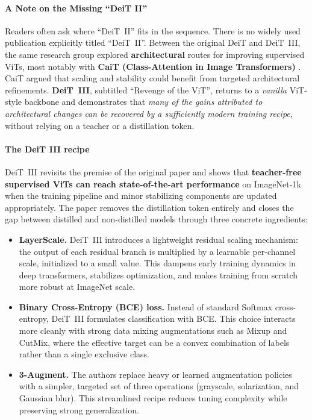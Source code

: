 \paragraph{A Note on the Missing ``DeiT II''}
\noindent
Readers often ask where ``DeiT~II'' fits in the sequence. There is no widely used publication explicitly titled ``DeiT~II''. Between the original DeiT and DeiT~III, the same research group explored \textbf{architectural} routes for improving supervised ViTs, most notably with \textbf{CaiT (Class-Attention in Image Transformers)} \cite{touvron2021_cait}. CaiT argued that scaling and stability could benefit from targeted architectural refinements. \textbf{DeiT~III}, subtitled ``Revenge of the ViT'', returns to a \emph{vanilla} ViT-style backbone and demonstrates that \emph{many of the gains attributed to architectural changes can be recovered by a sufficiently modern training recipe}, without relying on a teacher or a distillation token.

\paragraph{The DeiT III recipe}
\noindent
DeiT~III revisits the premise of the original paper and shows that \textbf{teacher-free supervised ViTs can reach state-of-the-art performance} on ImageNet-1k when the training pipeline and minor stabilizing components are updated appropriately. The paper removes the distillation token entirely and closes the gap between distilled and non-distilled models through three concrete ingredients:

\begin{itemize}
	\item \textbf{LayerScale.}
	DeiT~III introduces a lightweight residual scaling mechanism:
	the output of each residual branch is multiplied by a learnable per-channel scale,
	initialized to a small value.
	This dampens early training dynamics in deep transformers,
	stabilizes optimization,
	and makes training from scratch more robust at ImageNet scale.
	
	\item \textbf{Binary Cross-Entropy (BCE) loss.}
	Instead of standard Softmax cross-entropy,
	DeiT~III formulates classification with BCE.
	This choice interacts more cleanly with strong data mixing augmentations
	such as Mixup and CutMix,
	where the effective target can be a convex combination of labels
	rather than a single exclusive class.
	
	\newpage
	
	\item \textbf{3-Augment.}
	The authors replace heavy or learned augmentation policies
	with a simpler, targeted set of three operations
	(grayscale, solarization, and Gaussian blur).
	This streamlined recipe reduces tuning complexity while preserving strong generalization.
\end{itemize}

